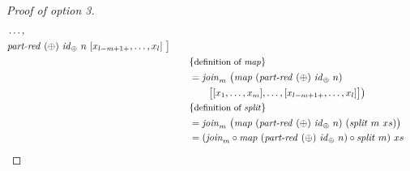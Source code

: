 \begin{proof}[Proof of option 3]
\begin{align*}
\begin{aligned}[t]
               &\ldots,\\
               &\partRed\ (\oplus)\ \id_\oplus\ n\ [x_{l-m+1+}, \ldots, x_l]\ \big]
      \end{aligned}\\
    &\qquad \comment{definition of \map}\\
    &\qquad = \join_m\ \big(\map\ (\partRed\ (\oplus)\ \id_\oplus\ n)\\
    &\qquad\qquad \big[[x_1, \ldots, x_m], \ldots, [x_{l-m+1+}, \ldots, x_l]\big]\big)\\
    &\qquad \comment{definition of \splitN}\\
    &\qquad = \join_m\ \big(\map\ (\partRed\ (\oplus)\ \id_\oplus\ n)\ (\splitN\ m\ xs)\big)\\
    &\qquad = (\join_m \circ \map\ (\partRed\ (\oplus)\ \id_\oplus\ n) \circ \splitN\ m)\ xs
  \end{align*}
\end{proof}
\newpage


